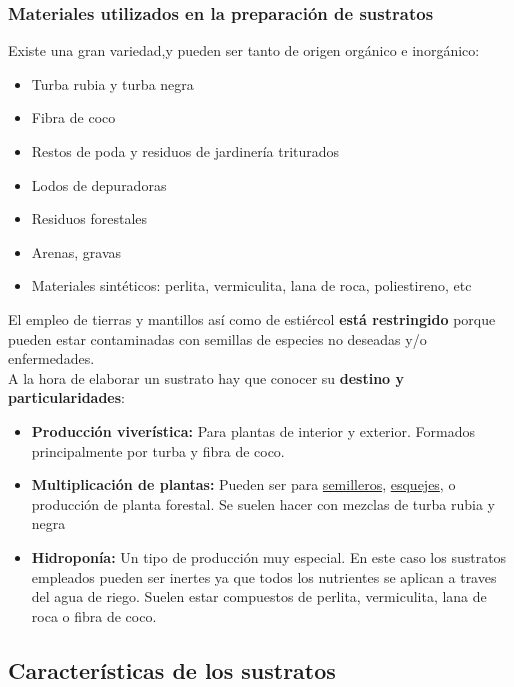 \documentclass[a4paper,12pt,oneside]{article}
\begin{document}
\subsubsection{Materiales utilizados en la preparación de sustratos}
\label{sec:orgfeb7f81}
Existe una gran variedad,y  pueden ser tanto de origen orgánico e inorgánico:
\begin{itemize}
\item Turba rubia y turba negra
\item Fibra de coco
\item Restos de poda y residuos de jardinería triturados
\item Lodos de depuradoras
\item Residuos forestales
\item Arenas, gravas
\item Materiales sintéticos: perlita, vermiculita, lana de roca, poliestireno, etc
\end{itemize}
El empleo de tierras y mantillos así como de estiércol \textbf{está restringido} porque
pueden estar contaminadas con semillas de especies no deseadas y/o
enfermedades.\\
A la hora de elaborar un sustrato hay que conocer su \textbf{destino y
particularidades}:\\
\begin{itemize}
\item \textbf{Producción viverística:} Para plantas de interior y exterior. Formados
principalmente por turba y fibra de coco.
\item \textbf{Multiplicación de plantas:} Pueden ser para \uline{semilleros}, \uline{esquejes}, o
producción de planta forestal. Se suelen hacer con mezclas de turba rubia y negra
\item \textbf{Hidroponía:} Un tipo de producción muy especial. En este caso los sustratos
empleados pueden ser inertes ya que todos los nutrientes se aplican a traves
del agua de riego. Suelen estar compuestos de perlita, vermiculita, lana de
roca o fibra de coco.
\end{itemize}
\subsection{Características de los sustratos}
\label{sec:org28efc49}
\end{document}

